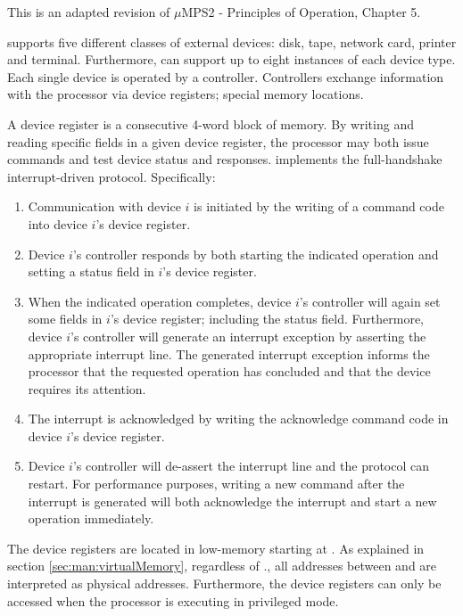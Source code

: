 \label{sec:man:devices}

This \acpt{} is an adapted revision of $\mu$MPS2 - Principles of Operation, Chapter 5.

\uarm{} supports five different classes of external devices: disk, tape, network card, printer and terminal. 
Furthermore, \uarm{} can support up to eight instances of each device type. 
Each single device is operated by a controller. 
Controllers exchange information with the processor via device registers; special memory locations.

A device register is a consecutive 4-word block of memory. 
By writing and reading specific fields in a given device register, the processor may both issue commands and test device status and responses.
\uarm{} implements the full-handshake interrupt-driven protocol. 
Specifically:
\begin{enumerate}
	\item Communication with device $i$ is initiated by the writing of a command code into device $i$’s device register.
	\item  Device $i$’s controller responds by both starting the indicated operation and setting a status field in $i$’s device register.
	\item When the indicated operation completes, device $i$’s controller will again set some fields in $i$’s device register; including the status field. Furthermore, device $i$’s controller will generate an interrupt exception by asserting the appropriate interrupt line. 
		The generated interrupt exception informs the processor that the requested operation has concluded and that the device requires its attention.
	\item The interrupt is acknowledged by writing the acknowledge command code in device $i$’s device register.
	\item Device $i$’s controller will de-assert the interrupt line and the protocol can restart. For performance purposes, writing a new command after the interrupt is generated will both acknowledge the interrupt and start a new operation immediately.
\end{enumerate}

The device registers are located in low-memory starting at . 
As explained in section \ref{sec:man:virtualMemory}, regardless of ., all addresses between  and  are interpreted as physical addresses. 
Furthermore, the device registers can only be accessed when the processor is executing in privileged mode.

